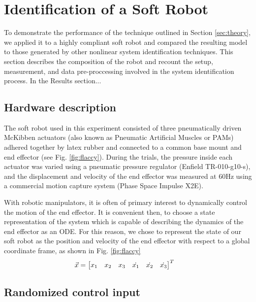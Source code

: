 \section{Identification of a Soft Robot}
\label{sec:experiment}

To demonstrate the performance of the technique outlined in Section \ref{sec:theory}, we applied it to a highly  compliant soft robot and compared the resulting model to those generated by other nonlinear system identification techniques.
This section describes the composition of the robot and recount the setup, measurement, and data pre-proccessing involved in the system identification process.
In the Results section...

\subsection{Hardware description}

The soft robot used in this experiment consisted of three pneumatically driven McKibben actuators (also known as Pneumatic Artificial Muscles or PAMs) adhered together by latex rubber and connected to a common base mount and end effector (see Fig. \ref{fig:flaccy}).
During the trials, the pressure inside each actuator was varied using a pneumatic pressure regulator (Enfield TR-010-g10-s), and the displacement and velocity of the end effector was measured at $60 \text{Hz}$ using a commercial motion capture system (Phase Space Impulse X2E).

With robotic manipulators, it is often of primary interest to dynamically control the motion of the end effector.
It is convenient then, to choose a state representation of the system which is capable of describing the dynamics of the end effector as an ODE.
For this reason, we chose to represent the state of our soft robot as the position and velocity of the end effector with respect to a global coordinate frame, as shown in Fig. \ref{fig:flaccy}
\begin{align}
    \vec{x} &= \begin{bmatrix}  x_1 & x_2 & x_3 & \dot{x_1} & \dot{x_2} & \dot{x_3}  \end{bmatrix}^T
    \label{eq:state}
\end{align}

\subsection{Randomized control input}


